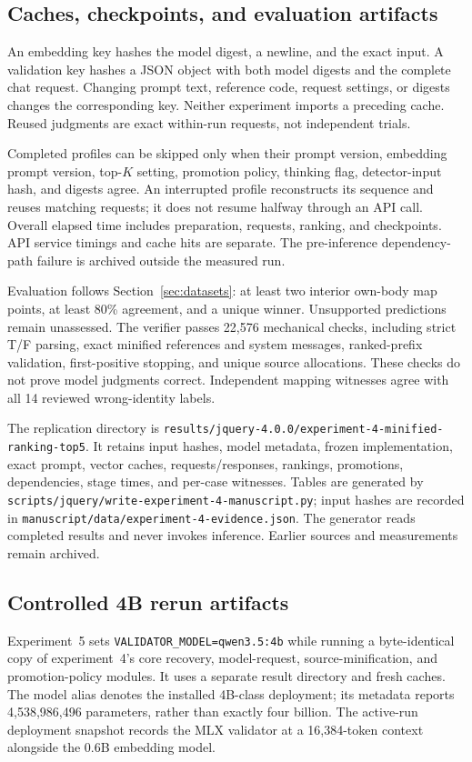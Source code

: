 \subsection{Caches, checkpoints, and evaluation artifacts}
An embedding key hashes the model digest, a newline, and the exact input. A validation key hashes a JSON object with both model digests and the complete chat request. Changing prompt text, reference code, request settings, or digests changes the corresponding key. Neither experiment imports a preceding cache. Reused judgments are exact within-run requests, not independent trials.

Completed profiles can be skipped only when their prompt version, embedding prompt version, top-$K$ setting, promotion policy, thinking flag, detector-input hash, and digests agree. An interrupted profile reconstructs its sequence and reuses matching requests; it does not resume halfway through an API call. Overall elapsed time includes preparation, requests, ranking, and checkpoints. API service timings and cache hits are separate. The pre-inference dependency-path failure is archived outside the measured run.

Evaluation follows Section~\ref{sec:datasets}: at least two interior own-body map points, at least 80\% agreement, and a unique winner. Unsupported predictions remain unassessed. The verifier passes 22,576 mechanical checks, including strict T/F parsing, exact minified references and system messages, ranked-prefix validation, first-positive stopping, and unique source allocations. These checks do not prove model judgments correct. Independent mapping witnesses agree with all 14 reviewed wrong-identity labels.

The replication directory is \nolinkurl{results/jquery-4.0.0/experiment-4-minified-ranking-top5}. It retains input hashes, model metadata, frozen implementation, exact prompt, vector caches, requests/responses, rankings, promotions, dependencies, stage times, and per-case witnesses. Tables are generated by \nolinkurl{scripts/jquery/write-experiment-4-manuscript.py}; input hashes are recorded in \nolinkurl{manuscript/data/experiment-4-evidence.json}. The generator reads completed results and never invokes inference. Earlier sources and measurements remain archived.

\subsection{Controlled 4B rerun artifacts}
Experiment~5 sets \texttt{VALIDATOR\_MODEL=qwen3.5:4b} while running a byte-identical copy of experiment~4's core recovery, model-request, source-minification, and promotion-policy modules. It uses a separate result directory and fresh caches. The model alias denotes the installed 4B-class deployment; its metadata reports 4,538,986,496 parameters, rather than exactly four billion. The active-run deployment snapshot records the MLX validator at a 16,384-token context alongside the 0.6B embedding model.

